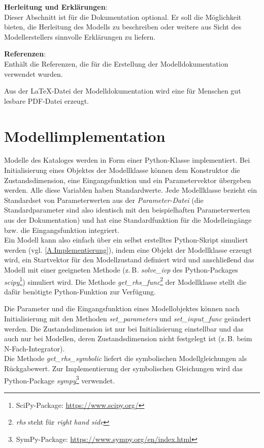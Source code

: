 \textbf{Herleitung und Erklärungen}:\\
Dieser Abschnitt ist für die Dokumentation optional. Er soll die Möglichkeit bieten, die Herleitung des Modells zu beschreiben oder weitere aus Sicht des Modellerstellers sinnvolle Erklärungen zu liefern.

\textbf{Referenzen}:\\
Enthält die Referenzen, die für die Erstellung der Modelldokumentation verwendet wurden.

Aus der \LaTeX-Datei der Modelldokumentation wird eine für Menschen gut lesbare PDF-Datei erzeugt. 

\section{Modellimplementation}
\label{Ch:Ergebnisse:Sec:Implementation}
Modelle des Kataloges werden in Form einer Python-Klasse implementiert. Bei Initialisierung eines Objektes der Modellklasse können dem Konstruktor die Zustandsdimension, eine Eingangsfunktion und ein Parametervektor übergeben werden. Alle diese Variablen haben Standardwerte. Jede Modellklasse bezieht ein Standardset von Parameterwerten aus der \textit{Parameter-Datei} (die Standardparameter sind also identisch mit den beispielhaften Parameterwerten aus der Dokumentation) und hat eine Standardfunktion für die Modelleingänge bzw. die Eingangsfunktion integriert.\\ 
Ein Modell kann also einfach über ein selbst erstelltes Python-Skript simuliert werden (vgl. \ref{A.Implementierung}), indem eine Objekt der Modellklasse erzeugt wird, ein Startvektor für den Modellzustand definiert wird und anschließend das Modell mit einer geeigneten Methode (z.\,B. \textit{solve\_ivp} des Python-Packages \textit{scipy}\footnote{SciPy-Package: \url{https://www.scipy.org/}}) simuliert wird. Die Methode \textit{get\_rhs\_func}\footnote{\textit{rhs} steht für \textit{right hand side}} der Modellklasse stellt die dafür benötigte Python-Funktion zur Verfügung.

Die Parameter und die Eingangsfunktion eines Modellobjektes können nach Initialisierung mit den Methoden \textit{set\_parameters} und \textit{set\_input\_func} geändert werden. Die Zustandsdimension ist nur bei Initialisierung einstellbar und das auch nur bei Modellen, deren Zustandsdimension nicht festgelegt ist (z.\,B. beim N-Fach-Integrator).\\
Die Methode \textit{get\_rhs\_symbolic} liefert die symbolischen Modellgleichungen als Rückgabewert. Zur Implementierung der symbolischen Gleichungen wird das Python-Package \textit{sympy}\footnote{SymPy-Package: \url{https://www.sympy.org/en/index.html}} verwendet.


